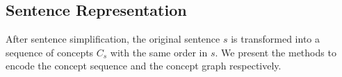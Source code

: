 

\subsection{Sentence Representation}
\label{sec:represent}
After sentence simplification, the original sentence $s$ is transformed into
a sequence of concepts $C_s$ with the same order in $s$. 
We present the methods to
encode the concept sequence and the concept graph respectively.

